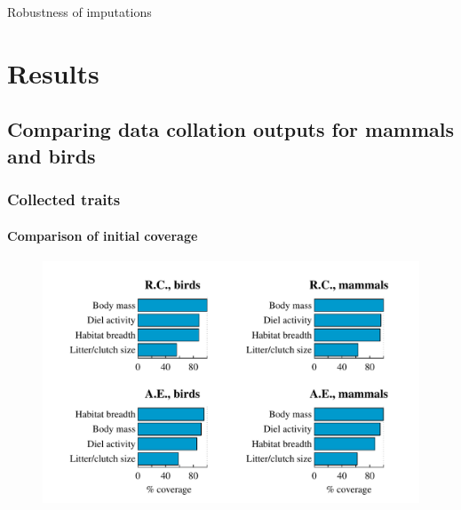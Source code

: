 Robustness of imputations

\section{Results}

\subsection{Comparing data collation outputs for mammals and birds}

\subsubsection{Collected traits}

\paragraph{Comparison of initial coverage}
\begin{figure}[h!]
\centering
\includegraphics[scale=0.7]{figures/chapter2/Comparison_with_RCooke/Coverage.pdf}
\caption[]{}
\label{ComparisonRC_coverage}
\end{figure}

